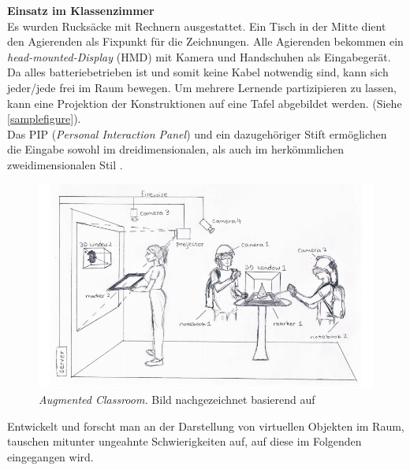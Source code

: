 \documentclass[deutsch]{llncs}
\begin{document}
 \textbf{Einsatz im Klassenzimmer} \\
Es wurden Rucksäcke mit Rechnern ausgestattet. Ein Tisch in der Mitte dient den Agierenden als Fixpunkt für die Zeichnungen. Alle Agierenden bekommen ein \emph{head-mounted-Display} (HMD) mit Kamera und Handschuhen als Eingabegerät. Da alles batteriebetrieben ist und somit keine Kabel notwendig sind, kann sich jeder/jede frei im Raum bewegen. 
Um mehrere Lernende partizipieren zu lassen, kann eine Projektion der Konstruktionen auf eine Tafel abgebildet werden. (Siehe \autoref{samplefigure}). \\
Das PIP (\emph{Personal Interaction Panel}) und ein dazugehöriger Stift ermöglichen die Eingabe sowohl im dreidimensionalen, als auch im herkömmlichen zweidimensionalen Stil \cite{1667626}. 

\begin{figure}[h]
	\centering
	\includegraphics[width=1\textwidth]{figures/classroom}
	\caption{\emph{Augmented Classroom.} Bild nachgezeichnet basierend auf \cite{Kaufmann:2002:MGE:1242073.1242086} }
	\label{fig:samplefigure}
\end{figure}

 Entwickelt und forscht man an der Darstellung von virtuellen Objekten im Raum, tauschen mitunter ungeahnte Schwierigkeiten auf, auf diese im Folgenden eingegangen wird.
\end{document}
